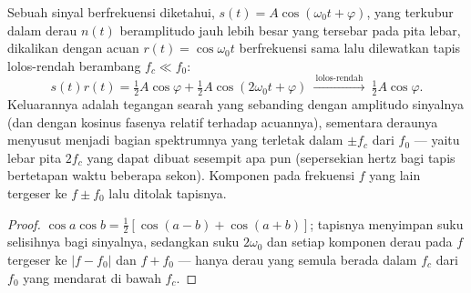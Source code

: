 \begin{proposition}\label{prop:b2:feedback-oscillators:lockin}
Sebuah sinyal berfrekuensi diketahui, $s(t) = A\cos(\omega_0t + \varphi)$, yang terkubur dalam
derau $n(t)$ beramplitudo jauh lebih besar yang tersebar pada pita lebar,
dikalikan dengan acuan $r(t) = \cos\omega_0t$ berfrekuensi sama
lalu dilewatkan tapis lolos-rendah berambang $f_c \ll f_0$:
\[
s(t)r(t) = \tfrac12A\cos\varphi + \tfrac12A\cos(2\omega_0t + \varphi)
\ \xrightarrow{\ \text{lolos-rendah}\ }\ \tfrac12A\cos\varphi .
\]
Keluarannya adalah tegangan searah yang sebanding dengan amplitudo sinyalnya (dan
dengan kosinus fasenya relatif terhadap acuannya), sementara deraunya
menyusut menjadi bagian spektrumnya yang terletak dalam $\pm f_c$ dari $f_0$
--- yaitu lebar pita $2f_c$ yang dapat dibuat sesempit apa pun (sepersekian
hertz bagi tapis bertetapan waktu beberapa sekon). Komponen pada frekuensi
$f$ yang lain tergeser ke $f \pm f_0$ lalu ditolak tapisnya.
\end{proposition}

\begin{proof}
$\cos a\cos b = \tfrac12[\cos(a - b) + \cos(a + b)]$; tapisnya menyimpan suku
selisihnya bagi sinyalnya, sedangkan suku $2\omega_0$ dan setiap komponen derau
pada $f$ tergeser ke $|f - f_0|$ dan $f + f_0$ --- hanya
derau yang semula berada dalam $f_c$ dari $f_0$ yang mendarat di bawah $f_c$.
\end{proof}

